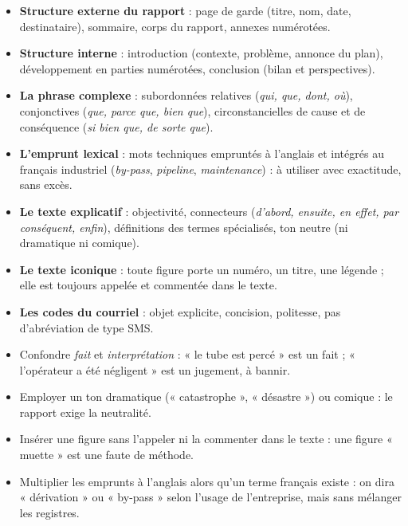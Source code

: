 \documentclass[11pt]{article}
\begin{document}
\begin{aretenir}
\begin{itemize}
\item \textbf{Structure externe du rapport} : page de garde (titre, nom, date, destinataire), sommaire, corps du rapport, annexes numérotées.
\item \textbf{Structure interne} : introduction (contexte, problème, annonce du plan), développement en parties numérotées, conclusion (bilan et perspectives).
\item \textbf{La phrase complexe} : subordonnées relatives (\emph{qui, que, dont, où}), conjonctives (\emph{que, parce que, bien que}), circonstancielles de cause et de conséquence (\emph{si bien que, de sorte que}).
\item \textbf{L'emprunt lexical} : mots techniques empruntés à l'anglais et intégrés au français industriel (\emph{by-pass}, \emph{pipeline}, \emph{maintenance}) : à utiliser avec exactitude, sans excès.
\item \textbf{Le texte explicatif} : objectivité, connecteurs (\emph{d'abord, ensuite, en effet, par conséquent, enfin}), définitions des termes spécialisés, ton neutre (ni dramatique ni comique).
\item \textbf{Le texte iconique} : toute figure porte un numéro, un titre, une légende ; elle est toujours appelée et commentée dans le texte.
\item \textbf{Les codes du courriel} : objet explicite, concision, politesse, pas d'abréviation de type SMS.
\end{itemize}
\end{aretenir}

\begin{attention}
\begin{itemize}
\item Confondre \emph{fait} et \emph{interprétation} : « le tube est percé » est un fait ; « l'opérateur a été négligent » est un jugement, à bannir.
\item Employer un ton dramatique (« catastrophe », « désastre ») ou comique : le rapport exige la neutralité.
\item Insérer une figure sans l'appeler ni la commenter dans le texte : une figure « muette » est une faute de méthode.
\item Multiplier les emprunts à l'anglais alors qu'un terme français existe : on dira « dérivation » ou « by-pass » selon l'usage de l'entreprise, mais sans mélanger les registres.
\end{itemize}
\end{attention}
\end{document}
